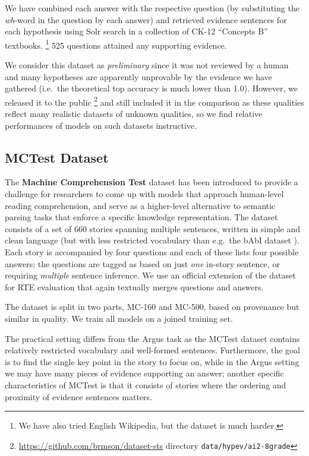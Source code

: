 \documentclass[11pt]{article}
\begin{document}
We have combined each answer with the respective question (by
substituting the \textit{wh}-word in the question by each answer) and retrieved
evidence sentences for each hypothesis using Solr search in a collection
of CK-12 ``Concepts B'' textbooks.%
\footnote{We have also tried English Wikipedia, but the dataset is much harder.}
525 questions attained any supporting evidence.

We consider this dataset as \textit{preliminary} since it was not reviewed
by a human and many hypotheses are apparently unprovable by the evidence
we have gathered (i.e.\ the theoretical top accuracy is much lower
than 1.0).  However, we released it to the public%
\footnote{\url{https://github.com/brmson/dataset-sts} directory \texttt{data/hypev/ai2-8grade}}
and still included it in the comparison as these
qualities reflect many realistic datasets of unknown qualities, so
we find relative performances of models on such datasets instructive.


\subsection{MCTest Dataset}

The \textbf{Machine Comprehension Test} \cite{MCTest} dataset has been introduced
to provide a challenge for researchers to come up with models that approach
human-level reading comprehension, and serve as a higher-level alternative
to semantic parsing tasks that enforce a specific knowledge representation.
The dataset consists of a set of 660 stories spanning
multiple sentences, written in simple and clean language (but with less restricted
vocabulary than e.g.\ the bAbI dataset \cite{bAbI}).  Each story is accompanied
by four questions and each of these lists four possible answers; the questions are tagged
as based on just \textit{one} in-story sentence, or requiring \textit{multiple} sentence inference.
We use an official extension of the dataset for RTE evaluation
that again textually merges questions and answers.

The dataset is split in two parts, MC-160 and MC-500, based on provenance but
similar in quality.
We train all models on a joined training set.

The practical setting differs from the Argus task as the MCTest dataset contains
relatively restricted vocabulary and well-formed sentences. Furthermore,
the goal is to find the single key point in the story to focus on, while
in the Argus setting we may have many pieces of evidence supporting an answer;
another specific characteristics of MCTest is that it consists of stories
where the ordering and proximity of evidence sentences matters.
\end{document}
